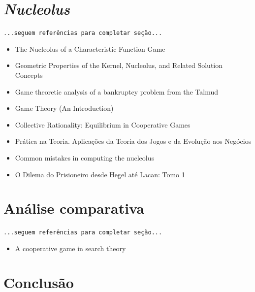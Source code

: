 \documentclass[
	article,			        %
	11pt,				          %
	oneside,			        %
	a4paper,			        %
	english,			        %
	brazil,				        %
	sumario=tradicional
]{abntex2}\usepackage[]{graphicx}\usepackage[]{color}
\begin{document}
\section{\emph{Nucleolus}}

\texttt{\color{red}...seguem referências para completar seção...}
  
  \begin{itemize}
    \item The Nucleolus of a Characteristic Function Game \cite{Schmeidler.1969}
    \item Geometric Properties of the Kernel, Nucleolus, and Related Solution Concepts \cite{Maschler.1979}
    \item Game theoretic analysis of a bankruptcy problem from the Talmud \cite{Aumann.1985}
    \item Game Theory (An Introduction) \cite[p.~219--307]{Barron.2007}
    \item Collective Rationality: Equilibrium in Cooperative Games \cite{Weirich.2009}
    \item Prática na Teoria. Aplicações da Teoria dos Jogos e da Evolução aos Negócios \cite{Marinho.2011}
    \item Common mistakes in computing the nucleolus \cite{Guajardo.2015}
    \item O Dilema do Prisioneiro desde Hegel até Lacan: Tomo 1 \cite{Faveret.2015}
  \end{itemize}

\section{Análise comparativa}

\texttt{\color{red}...seguem referências para completar seção...}

  \begin{itemize}
    \item A cooperative game in search theory \cite{Hohzaki.2009}

  \end{itemize}

% 

\section{Conclusão}
\end{document}

